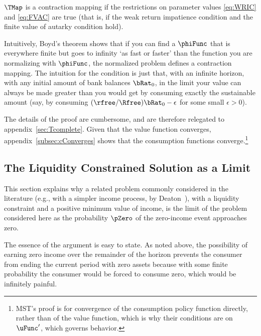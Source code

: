 \documentclass[BufferStockTheory]{subfiles}
\begin{document}
\hypertarget{MainTheorem}{}
\setcounter{theorem}{0}
\begin{theorem}
  \label{thm:contmap} $\TMap$ is a contraction mapping if
  the restrictions on parameter values \eqref{eq:WRIC} and
  \eqref{eq:FVAC} are true (that is, if the weak return impatience condition and the finite value of autarky condition hold).
\end{theorem}

Intuitively, Boyd's theorem shows that if you can find a $\phiFunc$ that is everywhere finite but goes to infinity `as fast or faster' than the function you are normalizing with $\phiFunc$, the normalized problem defines a contraction mapping.  The intuition for the {\FVAC} condition is just that, with an infinite horizon, with any initial amount of bank balances $\bRat_{0}$, in the limit your value can always be made greater than you would get by consuming exactly the sustainable amount (say, by consuming $(\rfree/\Rfree)\bRat_{0}-\epsilon$ for some small $\epsilon>0$).

The details of the proof are cumbersome, and are therefore relegated to
appendix~\ref{sec:Tcomplete}.  Given that the value function
converges, appendix~\ref{subsec:cConverges} shows that the consumption
functions converge.\footnote{MST's proof is for convergence of the consumption policy function directly, rather than of the value function, which is why their conditions are on $\uFunc^{\prime}$, which governs behavior.}

\hypertarget{The-Liquidity-Constrained-Solution-as-a-Limit}{}
\subsection{The Liquidity Constrained Solution as a Limit} \label{sec:deatonIsLimit}

This section explains why a related problem commonly considered in the
literature (e.g., with a simpler income process, by
Deaton~\citeyearpar{deatonLiqConstr}), with a liquidity constraint
and a positive minimum value of income, is the limit of the problem
considered here as the probability $\pZero$ of the zero-income event
approaches zero.

The essence of the argument is easy to state.  As noted above, the possibility of earning zero income over the remainder of the horizon prevents the consumer from ending the current period with zero assets because with some finite probability the consumer would be forced to consume zero, which would be infinitely painful.
\end{document}
